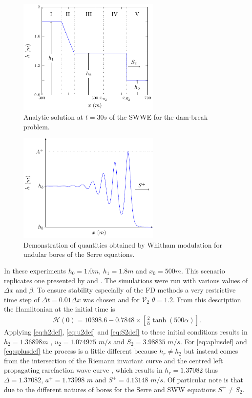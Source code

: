 \documentclass[SingleSpace,12pt,Proceedings]{Serre_ASCE}
\begin{document}
\begin{figure}
\centering
\includegraphics[width=7cm]{pics/explainers/SWWEana.pdf}
\caption{Analytic solution at $t=30s$ of the SWWE for the dam-break problem.}
\label{fig:SWWEanadiagram}
\end{figure}

\begin{figure}
\centering
\includegraphics[width=7cm]{pics/explainers/SERREex.pdf}
\caption{Demonstration of quantities obtained by Whitham modulation for undular bores of the Serre equations.}
\label{fig:Serreanadiagram}
\end{figure}

In these experiments $h_0 = 1.0m$, $h_1 = 1.8m$ and $x_0 = 500m$. This scenario replicates one presented by  and . The simulations were run with various values of $\Delta x$ and $\beta$. To ensure stability especially of the FD methods a very restrictive time step of $\Delta t = 0.01 \Delta x$ was chosen and for $\mathcal{V}_2$ $\theta = 1.2$. From this description the Hamiltonian at the initial time is
\begin{gather}
\label{eqn:HamilDBinit}
\mathcal{H} (0) = 10398.6 - 0.7848\times\left[\frac{2}{\alpha} \tanh\left(500 \alpha\right)\right].
\end{gather} 
Applying \eqref{eq:h2def}, \eqref{eq:u2def} and \eqref{eq:S2def} to these initial conditions results in $h_2 = 1.36898m$ , $u_2 = 1.074975$ $m/s$ and $S_2 = 3.98835$ $m/s$. For \eqref{eq:aplusdef} and \eqref{eq:splusdef} the process is a little different because $h_r \neq h_2$ but instead comes from the intersection of the Riemann invariant curve and the centred left propagating rarefaction wave curve \cite{El-etal-2006}, which results in $h_r = 1.37082$ thus $\Delta = 1.37082$,  $a^+ = 1.73998$ $m$ and $S^+ = 4.13148$ $m/s$. Of particular note is that due to the different natures of bores for the Serre and SWW equations $S^+ \neq S_2$.
\end{document}
